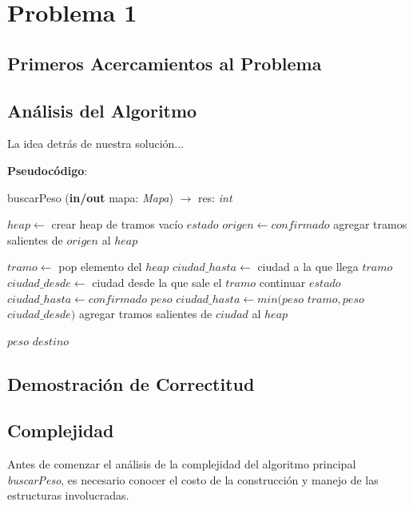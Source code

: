\section{Problema 1}


\subsection{Primeros Acercamientos al Problema}


\subsection{Análisis del Algoritmo}

\indent La idea detrás de nuestra solución...

\textbf{Pseudocódigo}:

\begin{algorithm}
\caption{buscarPeso (\textbf{in/out} mapa: \textsl{Mapa}) $\rightarrow$ res: \textsl{int}}
\begin{algorithmic}[1]

\STATE $heap \leftarrow$ crear heap de tramos vacío
\STATE $estado$ $origen \leftarrow confirmado$
\STATE agregar tramos salientes de $origen$ al $heap$

	\STATE $tramo \leftarrow$ pop elemento del $heap$
	\STATE $ciudad\_hasta \leftarrow$ ciudad a la que llega $tramo$
	\STATE $ciudad\_desde \leftarrow$ ciudad desde la que sale el $tramo$
	 \STATE continuar
	\ENDIF
	\STATE $estado$ $ciudad\_hasta \leftarrow confirmado$
	\STATE $peso$ $ciudad\_hasta \leftarrow min(peso$ $tramo,peso$ $ciudad\_desde)$
	\STATE agregar tramos salientes de $ciudad$ al $heap$
	
\ENDWHILE
\RETURN $peso$ $destino$  
\end{algorithmic}
\end{algorithm}

\subsection{Demostración de Correctitud}


\subsection{Complejidad}

Antes de comenzar el análisis de la complejidad del algoritmo principal \textsl{buscarPeso}, es necesario conocer el costo de la construcción y manejo de las estructuras involucradas.\\

